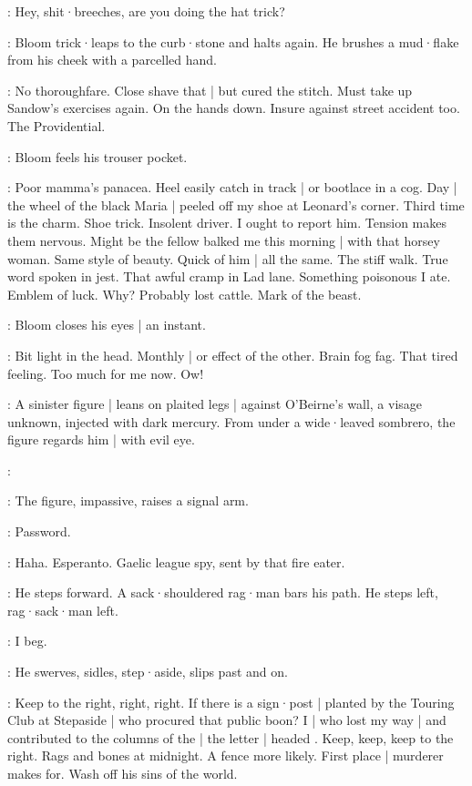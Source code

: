 \Motorman:
Hey,
shit·breeches,
are you doing the hat trick?

:
Bloom trick·leaps to the curb·stone and halts again.
He brushes a mud·flake from his cheek with a parcelled hand.

\Bloom:
No thoroughfare.
Close shave that |
but cured the stitch.
Must take up Sandow's exercises again.
On the hands down.
Insure against street accident too.
The Providential.

:
Bloom feels his trouser pocket.

\Bloom:
Poor mamma's panacea.
Heel easily catch in track |
or bootlace in a cog.
Day |
the wheel of the black Maria |
peeled off my shoe at Leonard's corner.
Third time is the charm.
Shoe trick.
Insolent driver.
I ought to report him.
Tension makes them nervous.
Might be the fellow balked me this morning |
with that horsey woman.
Same style of beauty.
Quick of him |
all the same.
The stiff walk.
True word spoken in jest.
That awful cramp in Lad lane.
Something poisonous I ate.
Emblem of luck.
Why?
Probably lost cattle.
Mark of the beast.

:
Bloom closes his eyes |
an instant.

\Bloom:
Bit light in the head.
Monthly |
or effect of the other.
Brain fog fag.
That tired feeling.
Too much for me now.
Ow!

:
A sinister figure |
leans on plaited legs |
against O'Beirne's wall,
a visage unknown,
injected with dark mercury.
From under a wide·leaved sombrero,
the figure regards him |
with evil eye.

\Bloom:

:
The figure,
impassive,
raises a signal arm.

\Figure:
Password.

\Bloom:
Haha.
Esperanto.
Gaelic league spy,
sent by that fire eater.

:
He steps forward.
A sack·shouldered rag·man bars his path.
He steps left,
rag·sack·man left.

\Bloom:
I beg.

:
He swerves,
sidles,
step·aside,
slips past and on.

\Bloom:
Keep to the right,
right,
right.
If there is a sign·post |
planted by the Touring Club at Stepaside |
who procured that public boon?
I |
who lost my way |
and contributed to the columns of the  |
the letter  |
headed .
Keep,
keep,
keep to the right.
Rags and bones at midnight.
A fence more likely.
First place |
murderer makes for.
Wash off his sins of the world.

